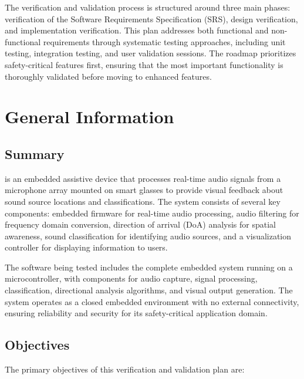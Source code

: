 \documentclass[12pt, titlepage]{article}
\begin{document}
The verification and validation process is structured around three main phases: verification of the Software Requirements Specification (SRS), design verification, and implementation verification. This plan addresses both functional and non-functional requirements through systematic testing approaches, including unit testing, integration testing, and user validation sessions. The roadmap prioritizes safety-critical features first, ensuring that the most important functionality is thoroughly validated before moving to enhanced features.

\section{General Information}

\subsection{Summary}

\progname{} is an embedded assistive device that processes real-time audio signals from a microphone array mounted on smart glasses to provide visual feedback about sound source locations and classifications. The system consists of several key components: embedded firmware for real-time audio processing, audio filtering for frequency domain conversion, direction of arrival (DoA) analysis for spatial awareness, sound classification for identifying audio sources, and a visualization controller for displaying information to users.

The software being tested includes the complete embedded system running on a microcontroller, with components for audio capture, signal processing, classification, directional analysis algorithms, and visual output generation. The system operates as a closed embedded environment with no external connectivity, ensuring reliability and security for its safety-critical application domain.

\subsection{Objectives}

The primary objectives of this verification and validation plan are:
\end{document}
